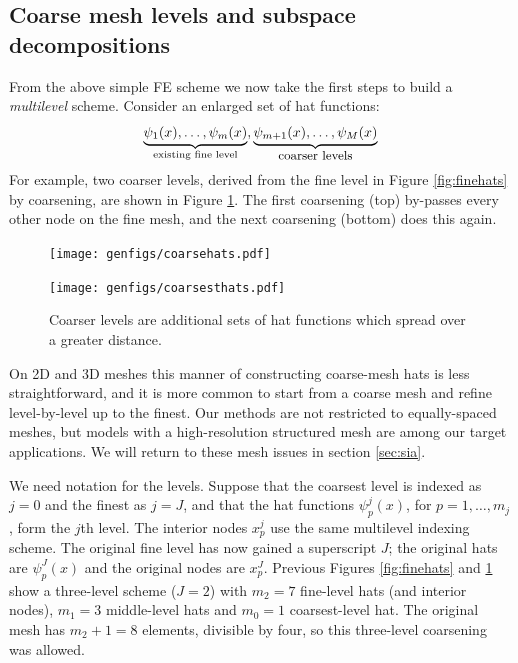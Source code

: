 \documentclass[letterpaper,final,12pt,reqno]{amsart}
\theoremstyle{claim}
\numberwithin{equation}{section}
\numberwithin{figure}{section}
\numberwithin{table}{section}
\numberwithin{theorem}{section}
\begin{document}
\subsection*{Coarse mesh levels and subspace decompositions}  From the above simple FE scheme we now take the first steps to build a \emph{multilevel} scheme.  Consider an enlarged set of hat functions:
    $$\underbrace{\psi_1(x),\dots,\psi_m(x)}_{\text{existing fine level}},\underbrace{\psi_{m+1}(x),\dots,\psi_M(x)}_{\text{\small coarser levels}}$$
For example, two coarser levels, derived from the fine level in Figure \ref{fig:finehats} by coarsening, are shown in Figure \ref{fig:coarsehats}.  The first coarsening (top) by-passes every other node on the fine mesh, and the next coarsening (bottom) does this again.

\begin{figure}
\texttt{[image: genfigs/coarsehats.pdf]}
\smallskip

\texttt{[image: genfigs/coarsesthats.pdf]}
\caption{Coarser levels are additional sets of hat functions which spread over a greater distance.}
\label{fig:coarsehats}
\end{figure}

On 2D and 3D meshes this manner of constructing coarse-mesh hats is less straightforward, and it is more common to start from a coarse mesh and refine level-by-level up to the finest.  Our methods are not restricted to equally-spaced meshes, but models with a high-resolution structured mesh \cite[for example]{Bueler2016,Winkelmannetal2011} are among our target applications. We will return to these mesh issues in section \ref{sec:sia}.

We need notation for the levels.  Suppose that the coarsest level is indexed as $j=0$ and the finest as $j=J$, and that the hat functions $\psi_p^j(x)$, for $p=1,\dots,m_j$, form the $j$th level.  The interior nodes $x_p^j$ use the same multilevel indexing scheme.  The original fine level has now gained a superscript $J$; the original hats are $\psi_p^J(x)$ and the original nodes are $x_p^J$.  Previous Figures \ref{fig:finehats} and \ref{fig:coarsehats} show a three-level scheme ($J=2$) with $m_2=7$ fine-level hats (and interior nodes), $m_1=3$ middle-level hats and $m_0=1$ coarsest-level hat.  The original mesh has $m_2+1=8$ elements, divisible by four, so this three-level coarsening was allowed.
\end{document}
